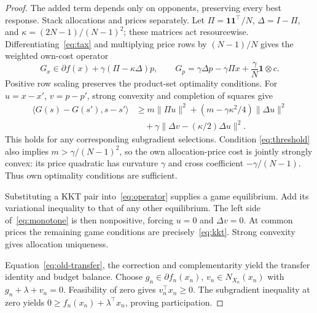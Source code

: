 \documentclass{article}
\begin{document}
\begin{proof}
The added term depends only on opponents, preserving every best response.
Stack allocations and prices separately. Let
\(\Pi=\mathbf1\mathbf1^\top/N\), \(\Delta=I-\Pi\), and
\(\kappa=(2N-1)/(N-1)^2\); these matrices act resourcewise.
Differentiating~\eqref{eq:tax} and multiplying price rows by \((N-1)/N\)
gives the weighted own-cost operator
\begin{equation}\label{eq:operator}
 G_x\in\partial f(x)+\gamma(\Pi-\kappa\Delta)p,\qquad
 G_p=\gamma\Delta p-\gamma\Pi x+\frac{\gamma}{N}\mathbf1\otimes c.
\end{equation}
Positive row scaling preserves the product-set optimality conditions.
For \(u=x-x'\), \(v=p-p'\), strong convexity and completion of squares give
\begin{equation}\label{eq:monotone}
\begin{aligned}
 \langle G(s)-G(s'),s-s'\rangle
 &\ge m\|\Pi u\|^2+(m-\gamma\kappa^2/4)\|\Delta u\|^2\\
 &\quad+\gamma\|\Delta v-(\kappa/2)\Delta u\|^2.
\end{aligned}
\end{equation}
This holds for any corresponding subgradient selections. Condition
\eqref{eq:threshold} also implies \(m>\gamma/(N-1)^2\), so the own
allocation-price cost is jointly strongly convex: its price quadratic
has curvature \(\gamma\) and cross coefficient \(-\gamma/(N-1)\).
Thus own optimality conditions are sufficient.

Substituting a KKT pair into~\eqref{eq:operator} supplies a game equilibrium.
Add its variational inequality to that of any other equilibrium.
The left side of~\eqref{eq:monotone} is then nonpositive, forcing
\(u=0\) and \(\Delta v=0\). At common prices the remaining game
conditions are precisely~\eqref{eq:kkt}. Strong convexity gives allocation
uniqueness.

Equation~\eqref{eq:old-transfer}, the correction and complementarity yield
the transfer identity and budget balance. Choose
\(g_n\in\partial f_n(x_n)\), \(v_n\in N_{X_n}(x_n)\) with
\(g_n+\lambda+v_n=0\). Feasibility of zero gives \(v_n^\top x_n\ge0\).
The subgradient inequality at zero yields
\(0\ge f_n(x_n)+\lambda^\top x_n\), proving participation.
\end{proof}
\end{document}
